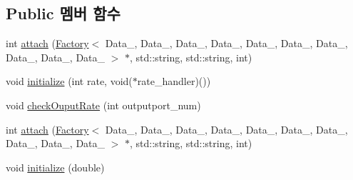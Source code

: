 \subsection*{Public 멤버 함수}
\begin{DoxyCompactItemize}
\item 
int \hyperlink{classOutputDataPort__Fac_af71f2f724610f1b40b60c2cedf6b2bf9}{attach} (\hyperlink{classFactory}{Factory}$<$ Data\+\_, Data\+\_, Data\+\_, Data\+\_, Data\+\_, Data\+\_, Data\+\_, Data\+\_, Data\+\_, Data\+\_ $>$ $\ast$, std\+::string, std\+::string, int)
\item 
void \hyperlink{classOutputDataPort__Fac_a644bcb7df4cfa36ea1dc66fad86d42c9}{initialize} (int rate, void($\ast$rate\+\_\+handler)())
\item 
void \hyperlink{classOutputDataPort__Fac_a3e9787f5622b5ce092ee4ae142837a73}{check\+Ouput\+Rate} (int outputport\+\_\+num)
\item 
int \hyperlink{classOutputDataPort__Fac_af71f2f724610f1b40b60c2cedf6b2bf9}{attach} (\hyperlink{classFactory}{Factory}$<$ Data\+\_, Data\+\_, Data\+\_, Data\+\_, Data\+\_, Data\+\_, Data\+\_, Data\+\_, Data\+\_, Data\+\_ $>$ $\ast$, std\+::string, std\+::string, int)
\item 
void \hyperlink{classOutputDataPort__Fac_a32be415379e7bee6cdb82cbd30a223ac}{initialize} (double)
\end{DoxyCompactItemize}
